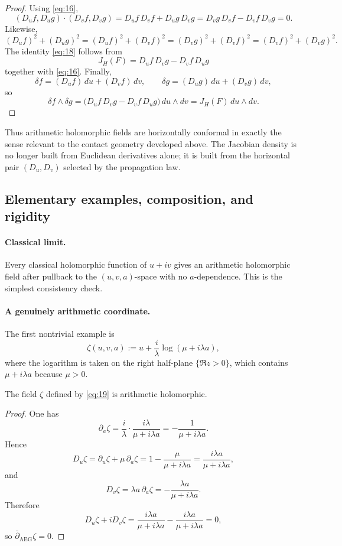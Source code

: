 \begin{proof}
Using \eqref{eq:16},
\[
(D_u f,D_u g)\cdot(D_v f,D_v g)
=
D_u f\,D_v f+D_u g\,D_v g
=
D_v g\,D_v f-D_v f\,D_v g
=0.
\]
Likewise,
\[
(D_u f)^2+(D_u g)^2
=
(D_u f)^2+(D_v f)^2
=
(D_v g)^2+(D_v f)^2
=
(D_v f)^2+(D_v g)^2.
\]
The identity \eqref{eq:18} follows from
\[
J_H(F)=D_u f\,D_v g-D_v f\,D_u g
\]
together with \eqref{eq:16}. Finally,
\[
\delta f=(D_u f)\,du+(D_v f)\,dv,
\qquad
\delta g=(D_u g)\,du+(D_v g)\,dv,
\]
so
\[
\delta f\wedge \delta g
=
\bigl(D_u f\,D_v g-D_v f\,D_u g\bigr)\,du\wedge dv
=
J_H(F)\,du\wedge dv.
\]
\end{proof}

Thus arithmetic holomorphic fields are horizontally conformal in exactly the sense relevant to the contact geometry developed above. The Jacobian density is no longer built from Euclidean derivatives alone; it is built from the horizontal pair $(D_u,D_v)$ selected by the propagation law.

\subsection{Elementary examples, composition, and rigidity}

\paragraph{Classical limit.}
Every classical holomorphic function of $u+iv$ gives an arithmetic holomorphic field after pullback to the $(u,v,a)$-space with no $a$-dependence. This is the simplest consistency check.

\paragraph{A genuinely arithmetic coordinate.}
The first nontrivial example is
\begin{equation}\label{eq:19}\tag{19}
\zeta(u,v,a):=
u+\frac{i}{\lambda}\log(\mu+i\lambda a),
\end{equation}
where the logarithm is taken on the right half-plane $\{\Re z>0\}$, which contains $\mu+i\lambda a$ because $\mu>0$.

\begin{proposition}\label{prop:zeta_is_arithmetic_holomorphic}
The field $\zeta$ defined by \eqref{eq:19} is arithmetic holomorphic.
\end{proposition}

\begin{proof}
One has
\[
\partial_a\zeta
=
\frac{i}{\lambda}\cdot\frac{i\lambda}{\mu+i\lambda a}
=
-\frac{1}{\mu+i\lambda a}.
\]
Hence
\[
D_u\zeta
=
\partial_u\zeta+\mu\,\partial_a\zeta
=
1-\frac{\mu}{\mu+i\lambda a}
=
\frac{i\lambda a}{\mu+i\lambda a},
\]
and
\[
D_v\zeta
=
\lambda a\,\partial_a\zeta
=
-\frac{\lambda a}{\mu+i\lambda a}.
\]
Therefore
\[
D_u\zeta+iD_v\zeta
=
\frac{i\lambda a}{\mu+i\lambda a}
-
\frac{i\lambda a}{\mu+i\lambda a}
=
0,
\]
so $\bar\partial_{\mathrm{AEG}}\zeta=0$.
\end{proof}

